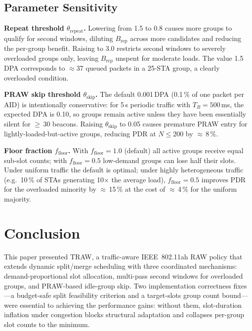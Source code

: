 \documentclass[conference]{IEEEtran}
\begin{document}
\subsection{Parameter Sensitivity}

\textbf{Repeat threshold $\theta_\mathrm{repeat}$.}
Lowering from 1.5 to 0.8 causes more groups to qualify for second
windows, diluting $B_\mathrm{rep}$ across more candidates and reducing
the per-group benefit.
Raising to 3.0 restricts second windows to severely overloaded groups
only, leaving $B_\mathrm{rep}$ unspent for moderate loads.
The value 1.5 DPA corresponds to $\approx$37 queued packets in a
25-STA group, a clearly overloaded condition.

\textbf{PRAW skip threshold $\theta_\mathrm{skip}$.}
The default 0.001\,DPA (0.1\,\% of one packet per AID) is intentionally
conservative: for 5\,s periodic traffic with $T_B\!=\!500$\,ms, the
expected DPA is 0.10, so groups remain active unless they have been
essentially silent for $\geq$\,30 beacons.
Raising $\theta_\mathrm{skip}$ to 0.05 causes premature PRAW entry
for lightly-loaded-but-active groups, reducing PDR at $N\!\leq\!200$
by $\approx$\,8\,\%.

\textbf{Floor fraction $f_\mathrm{floor}$.}
With $f_\mathrm{floor}\!=\!1.0$ (default) all active groups receive
equal sub-slot counts; with $f_\mathrm{floor}\!=\!0.5$
low-demand groups can lose half their slots.
Under uniform traffic the default is optimal; under highly
heterogeneous traffic (e.g.\ 10\,\% of STAs generating 10$\times$ the
average load), $f_\mathrm{floor}\!=\!0.5$ improves PDR for the
overloaded minority by $\approx$\,15\,\% at the cost of $\approx$\,4\,\%
for the uniform majority.

\section{Conclusion}
\label{sec:conc}

This paper presented TRAW, a traffic-aware IEEE~802.11ah RAW policy
that extends dynamic split/merge scheduling with three coordinated
mechanisms: demand-proportional slot allocation, multi-pass second
windows for overloaded groups, and PRAW-based idle-group skip.
Two implementation correctness fixes---a budget-safe split feasibility
criterion and a target-slots group count bound---were essential to
achieving the performance gains: without them, slot-duration inflation
under congestion blocks structural adaptation and collapses per-group
slot counts to the minimum.
\end{document}
